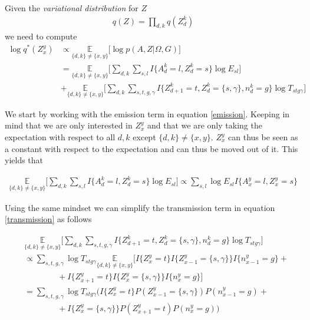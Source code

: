 Given the \textit{variational distribution} for $Z$
\begin{align}
  q(Z) = \prod_{d,k} q(Z_d^k)
\end{align}
we need to compute
\begin{align}
  \log q^*(Z_x^y) & \propto \underset{\{d,k\} \neq \{x,y\}}{\mathbb{E}} \bigg[ \log p(A,Z|\Omega, G) \bigg] \nonumber \\
  & = \underset{\{d,k\} \neq \{x,y\}}{\mathbb{E}} \bigg[\sum_{d,k}\sum_{s,l} I\{A_d^k=l, Z_d^k=s\} \log E_{sl} \bigg] \label{emission} \\
      & + \underset{\{d,k\} \neq \{x,y\}}{\mathbb{E}} \bigg[ \sum_{d,k}\sum_{s,t,g,\gamma} I\{Z_{d+1}^k = t, Z_d^k = \{s,\gamma\}, n_d^k = g\} \log T_{stg\gamma} \bigg] \label{transmission}
\end{align}

We start by working with the emission term in equation \eqref{emission}. Keeping in mind that we are only interested in $Z_x^y$ and that we are only taking the expectation with respect to all $d, k$ except $\{d,k\} \neq \{x,y\}$. $Z_x^y$ can thus be seen as a constant with respect to the expectation and can thus be moved out of it. This yields that

\begin{align}
  \underset{\{d,k\} \neq \{x,y\}}{\mathbb{E}} \bigg[\sum_{d,k}\sum_{s,l} I\{A_d^k=l, Z_d^k=s\} \log E_{sl} \bigg] \propto
  \sum_{s,l} \log E_{sl} I\{A_x^y=l, Z_x^y=s\}
  \label{expanded_emission}
\end{align}

Using the same mindset we can simplify the transmission term in equation \eqref{transmission} as follows

\begin{align}
  & \underset{\{d,k\} \neq \{x,y\}}{\mathbb{E}} \bigg[ \sum_{d,k}\sum_{s,t,g,\gamma} I\{Z_{d+1}^k = t, Z_d^k = \{s,\gamma\}, n_d^k = g\} \log T_{stg\gamma} \bigg] \nonumber\\
  & \propto \sum_{s,t,g,\gamma} \log T_{stg\gamma} \underset{\{d,k\} \neq \{x,y\}}{\mathbb{E}} \bigg[
  I\{Z_{x}^y = t\} I\{Z_{x-1}^y = \{s,\gamma\}\} I\{n_{x-1}^y = g\} + \nonumber \\
  & \qquad\qquad + I\{Z_{x+1}^y = t\} I\{ Z_x^y = \{s,\gamma\}\} I\{n_x^y = g\}\bigg] \nonumber \\
  & = \sum_{s,t,g,\gamma} \log T_{stg\gamma} \bigg( I\{Z_x^y = t\}P(Z_{x-1}^y = \{s,\gamma\})P(n_{x-1}^y = g) + \nonumber \\
  & \qquad\qquad + I\{Z_x^y = \{s,\gamma\}\}P(Z_{x+1}^y = t)P(n_x^y = g) \bigg)
  \label{expanded_transmission}
\end{align}

